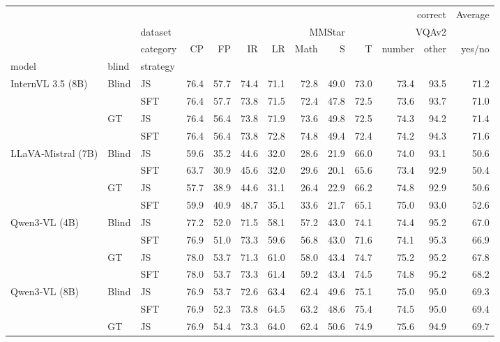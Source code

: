 \begin{tabular}{lllrrrrrrrrrr}
\toprule
 &  &  & \multicolumn{9}{r}{correct} & Average \\
 &  & dataset & \multicolumn{6}{r}{MMStar} & \multicolumn{3}{r}{VQAv2} &  \\
 &  & category & CP & FP & IR & LR & Math & S&T & number & other & yes/no &  \\
model & blind & strategy &  &  &  &  &  &  &  &  &  &  \\
\midrule
\multirow[t]{4}{*}{InternVL 3.5 (8B)} & \multirow[t]{2}{*}{Blind} & JS & 76.4 & 57.7 & 74.4 & 71.1 & 72.8 & 49.0 & 73.0 & 73.4 & 93.5 & 71.2 \\
 &  & SFT & 76.4 & 57.7 & 73.8 & 71.5 & 72.4 & 47.8 & 72.5 & 73.6 & 93.7 & 71.0 \\
\cline{2-13}
 & \multirow[t]{2}{*}{GT} & JS & 76.4 & 56.4 & 73.8 & 71.9 & 73.6 & 49.8 & 72.5 & 74.3 & 94.2 & 71.4 \\
 &  & SFT & 76.4 & 56.4 & 73.8 & 72.8 & 74.8 & 49.4 & 72.4 & 74.2 & 94.3 & 71.6 \\
\cline{1-13} \cline{2-13}
\multirow[t]{4}{*}{LLaVA‑Mistral (7B)} & \multirow[t]{2}{*}{Blind} & JS & 59.6 & 35.2 & 44.6 & 32.0 & 28.6 & 21.9 & 66.0 & 74.0 & 93.1 & 50.6 \\
 &  & SFT & 63.7 & 30.9 & 45.6 & 32.0 & 29.6 & 20.1 & 65.6 & 73.4 & 92.9 & 50.4 \\
\cline{2-13}
 & \multirow[t]{2}{*}{GT} & JS & 57.7 & 38.9 & 44.6 & 31.1 & 26.4 & 22.9 & 66.2 & 74.8 & 92.9 & 50.6 \\
 &  & SFT & 59.9 & 40.9 & 48.7 & 35.1 & 33.6 & 21.7 & 65.1 & 75.0 & 93.0 & 52.6 \\
\cline{1-13} \cline{2-13}
\multirow[t]{4}{*}{Qwen3‑VL (4B)} & \multirow[t]{2}{*}{Blind} & JS & 77.2 & 52.0 & 71.5 & 58.1 & 57.2 & 43.0 & 74.1 & 74.4 & 95.2 & 67.0 \\
 &  & SFT & 76.9 & 51.0 & 73.3 & 59.6 & 56.8 & 43.0 & 71.6 & 74.1 & 95.3 & 66.9 \\
\cline{2-13}
 & \multirow[t]{2}{*}{GT} & JS & 78.0 & 53.7 & 71.3 & 61.0 & 58.0 & 43.4 & 74.7 & 75.2 & 95.2 & 67.8 \\
 &  & SFT & 78.0 & 53.7 & 73.3 & 61.4 & 59.2 & 43.4 & 74.5 & 74.8 & 95.2 & 68.2 \\
\cline{1-13} \cline{2-13}
\multirow[t]{3}{*}{Qwen3‑VL (8B)} & \multirow[t]{2}{*}{Blind} & JS & 76.9 & 53.7 & 72.6 & 63.4 & 62.4 & 49.6 & 75.1 & 75.0 & 95.0 & 69.3 \\
 &  & SFT & 76.9 & 52.3 & 73.8 & 64.5 & 63.2 & 48.6 & 75.4 & 74.5 & 95.0 & 69.4 \\
\cline{2-13}
 & GT & JS & 76.9 & 54.4 & 73.3 & 64.0 & 62.4 & 50.6 & 74.9 & 75.6 & 94.9 & 69.7 \\
\cline{1-13} \cline{2-13}
\bottomrule
\end{tabular}

